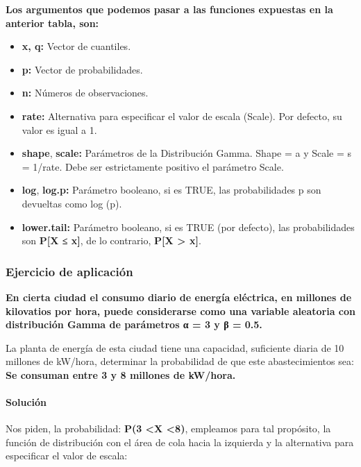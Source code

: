 \documentclass[
]{article}
\begin{document}
\textbf{Los argumentos que podemos pasar a las funciones expuestas en la
anterior tabla, son:}

\begin{itemize}
\item
  \textbf{x, q:} Vector de cuantiles.
\item
  \textbf{p:} Vector de probabilidades.
\item
  \textbf{n:} Números de observaciones.
\item
  \textbf{rate:} Alternativa para especificar el valor de escala
  (Scale). Por defecto, su valor es igual a 1.
\item
  \textbf{shape}, \textbf{scale:} Parámetros de la Distribución Gamma.
  Shape = a y Scale = s = 1/rate. Debe ser estrictamente positivo el
  parámetro Scale.
\item
  \textbf{log}, \textbf{log.p:} Parámetro booleano, si es TRUE, las
  probabilidades p son devueltas como log (p).
\item
  \textbf{lower.tail:} Parámetro booleano, si es TRUE (por defecto), las
  probabilidades son \textbf{P{[}X ≤ x{]}}, de lo contrario,
  \textbf{P{[}X \textgreater{} x{]}}.
\end{itemize}

\hypertarget{ejercicio-de-aplicaciuxf3n-1}{%
\subsubsection{Ejercicio de
aplicación}\label{ejercicio-de-aplicaciuxf3n-1}}

\textbf{En cierta ciudad el consumo diario de energía eléctrica, en
millones de kilovatios por hora, puede considerarse como una variable
aleatoria con distribución Gamma de parámetros α = 3 y β = 0.5.}

La planta de energía de esta ciudad tiene una capacidad, suficiente
diaria de 10 millones de kW/hora, determinar la probabilidad de que este
abastecimientos sea: \textbf{Se consuman entre 3 y 8 millones de
kW/hora.}

\hypertarget{soluciuxf3n-1}{%
\paragraph{Solución}\label{soluciuxf3n-1}}

Nos piden, la probabilidad: \textbf{P(3 \textless X \textless8)},
empleamos para tal propósito, la función de distribución con el área de
cola hacia la izquierda y la alternativa para especificar el valor de
escala:
\end{document}
